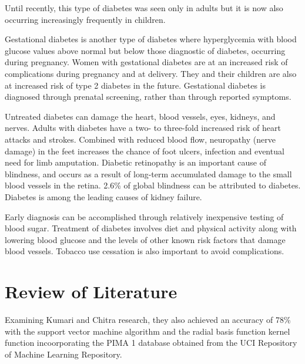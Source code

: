 \documentclass[12pt]{article}
\begin{document}
Until recently, this type of diabetes was seen only in adults but it is now also occurring increasingly frequently in children.

Gestational diabetes is another type of diabetes where hyperglycemia with blood glucose values above normal but below those diagnostic of diabetes, occurring during pregnancy. Women with gestational diabetes are at an increased risk of complications during pregnancy and at delivery. They and their children are also at increased risk of type 2 diabetes in the future. Gestational diabetes is diagnosed through prenatal screening, rather than through reported symptoms.

Untreated diabetes can damage the heart, blood vessels, eyes, kidneys, and nerves. Adults with diabetes have a two- to three-fold increased risk of heart attacks and strokes. Combined with reduced blood flow, neuropathy (nerve damage) in the feet increases the chance of foot ulcers, infection and eventual need for limb amputation. Diabetic retinopathy is an important cause of blindness, and occurs as a result of long-term accumulated damage to the small blood vessels in the retina. 2.6\% of global blindness can be attributed to diabetes. Diabetes is among the leading causes of kidney failure.

Early diagnosis can be accomplished through relatively inexpensive testing of blood sugar. Treatment of diabetes involves diet and physical activity along with lowering blood glucose and the levels of other known risk factors that damage blood vessels. Tobacco use cessation is also important to avoid complications. \cite{alberti_zimmet_2004}\cite{internationaldiabetesfederation}

\newpage
\section{Review of Literature}

Examining Kumari and Chitra \cite{kumarandchitra} research, they also achieved an accuracy of 78\% with the support vector machine algorithm and the radial basis function kernel function incoorporating the PIMA 1 database obtained from the UCI Repository of Machine Learning Repository. 
\end{document}
